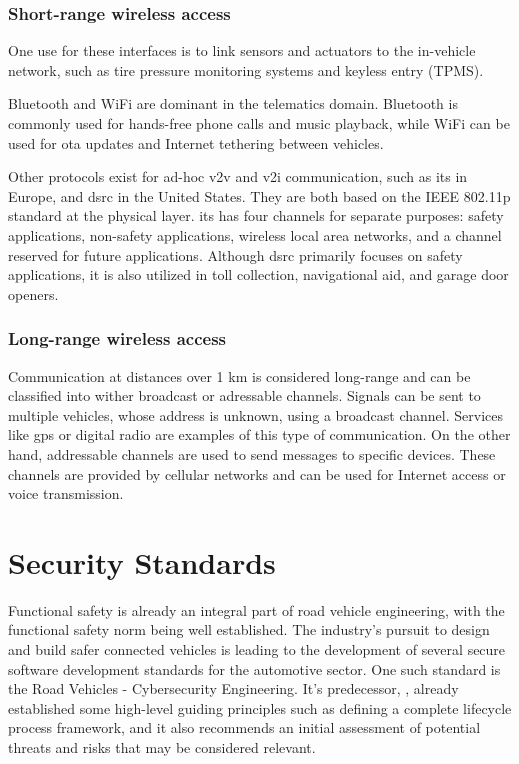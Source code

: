 \subsubsection{Short-range wireless access}

One use for these interfaces is to link sensors and actuators to the in-vehicle network, such as tire pressure monitoring systems and keyless entry (TPMS).\par
Bluetooth and WiFi are dominant in the telematics domain. Bluetooth is commonly used for hands-free phone calls and music playback, while WiFi can be used for \gls{ota} updates and Internet tethering between vehicles.\par
Other protocols exist for ad-hoc \gls{v2v} and \gls{v2i} communication, such as \gls{its} in Europe, and \gls{dsrc} in the United States. They are both based on the IEEE 802.11p standard at the physical layer. \gls{its} has four channels for separate purposes: safety applications, non-safety applications, wireless local area networks, and a channel reserved for future applications. Although \gls{dsrc} primarily focuses on safety applications, it is also utilized in toll collection, navigational aid, and garage door openers.

\subsubsection{Long-range wireless access}

Communication at distances over 1 km is considered long-range and can be classified into wither broadcast or adressable channels. Signals can be sent to multiple vehicles, whose address is unknown, using a broadcast channel. Services like \gls{gps} or digital radio are examples of this type of communication. On the other hand, addressable channels are used to send messages to specific devices. These channels are provided by cellular networks and can be used for Internet access or voice transmission.

\section{Security Standards}

Functional safety is already an integral part of road vehicle engineering, with the functional safety norm \cite{ISO26262} being well established. The industry's pursuit to design and build safer connected vehicles is leading to the development of several secure software development standards for the automotive sector. One such standard is the \cite{ISO21434} Road Vehicles - Cybersecurity Engineering. It's predecessor, \cite{SAEJ3061}, already established some high-level guiding principles such as defining a complete lifecycle process framework, and it also recommends an initial assessment of potential threats and risks that may be considered relevant.\par

